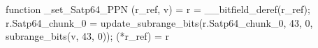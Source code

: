 function _set_Satp64_PPN (r_ref, v) = {
    r = __bitfield_deref(r_ref);
    r.Satp64_chunk_0 = update_subrange_bits(r.Satp64_chunk_0, 43, 0, subrange_bits(v, 43, 0));
    (*r_ref) = r
}
